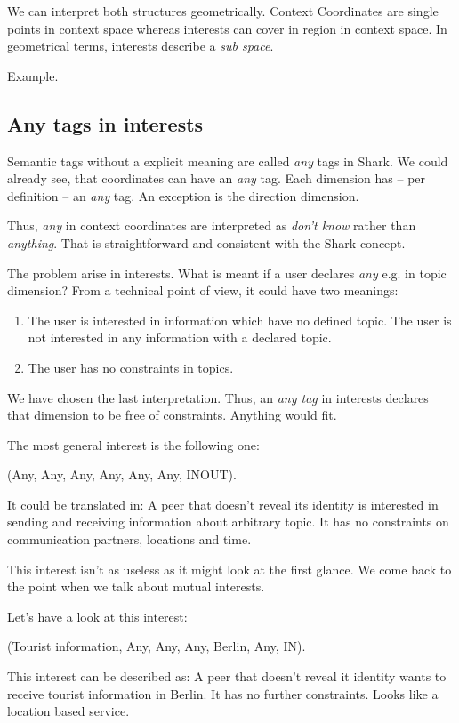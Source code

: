 We can interpret both structures geometrically. Context Coordinates are single points in context space whereas interests can cover in region in context space. In geometrical terms, interests describe a {\it sub space}.

Example.

\subsection{Any tags in interests}
Semantic tags without a explicit meaning are called {\it any} tags in Shark.
We could already see, that coordinates can have an {\it any} tag. Each dimension has -- per definition -- an {\it any} tag. An exception is the direction dimension.

Thus, {\it any} in context coordinates are interpreted as {\it don't know} rather than {\it anything}. That is straightforward and consistent with the Shark concept.

The problem arise in interests. What is meant if a user declares {\it any} e.g. in topic dimension? From a technical point of view, it could have two meanings: 
\begin{enumerate}
    \item The user is interested in information which have no defined topic. The user is not interested in any information with a declared topic.
\item
The user has no constraints in topics. 
\end{enumerate}

We have chosen the last interpretation. Thus, an {\it any tag} in interests declares that dimension to be free of constraints. Anything would fit.

The most general interest is the following one:

(Any, Any, Any, Any, Any, Any, INOUT).

It could be translated in: A peer that doesn't reveal its identity is interested in sending and receiving information about arbitrary topic. It has no constraints on communication partners, locations and time. 

This interest isn't as useless as it might look at the first glance. We come back to the point when we talk about mutual interests.

Let's have a look at this interest:

(Tourist information, Any, Any, Any, Berlin, Any, IN).

This interest can be described as: A peer that doesn't reveal it identity wants to receive tourist information in Berlin. It has no further constraints. Looks like a location based service.

